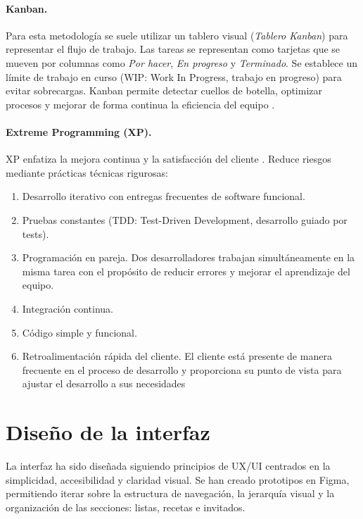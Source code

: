 \paragraph{Kanban.} Para esta metodología se suele utilizar un tablero visual (\textit{Tablero Kanban}) para representar el flujo de trabajo. Las tareas se representan como tarjetas que se mueven por columnas como \textit{Por hacer}, \textit{En progreso} y \textit{Terminado}. Se establece un límite de trabajo en curso (WIP: Work In Progress, trabajo en progreso) para evitar sobrecargas. Kanban permite detectar cuellos de botella, optimizar procesos y mejorar de forma continua la eficiencia del equipo \cite{kanban}.

\paragraph{Extreme Programming (XP).} XP enfatiza la mejora continua y la satisfacción del cliente \cite{extreme-programming,extreme-programming-alliance}. Reduce riesgos mediante prácticas técnicas rigurosas:

\begin{enumerate}
    \item Desarrollo iterativo con entregas frecuentes de software funcional.
    \item Pruebas constantes (TDD: Test-Driven Development, desarrollo guiado por tests).
    \item Programación en pareja. Dos desarrolladores trabajan simultáneamente en la misma tarea con el propósito de reducir errores y mejorar el aprendizaje del equipo.
    \item Integración continua.
    \item Código simple y funcional.
    \item Retroalimentación rápida del cliente. El cliente está presente de manera frecuente en el proceso de desarrollo y proporciona su punto de vista para ajustar el desarrollo a sus necesidades
\end{enumerate}

\section{Diseño de la interfaz}

La interfaz ha sido diseñada siguiendo principios de UX/UI centrados en la simplicidad, accesibilidad y claridad visual. Se han creado prototipos en Figma, permitiendo iterar sobre la estructura de navegación, la jerarquía visual y la organización de las secciones: listas, recetas e invitados.

